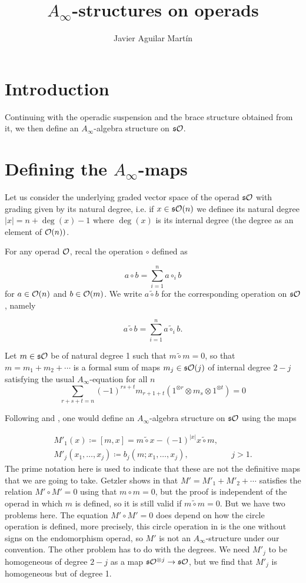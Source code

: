 \documentclass[twoside]{article}
\begin{document}
\title{$A_\infty$-structures on operads}
\author{Javier Aguilar Martín}
\maketitle

\section{Introduction}
Continuing with the operadic suspension and the brace structure obtained from it, we then define an $A_\infty$-algebra structure on $\mathfrak{s}{\mathcal O}$.


\section{Defining the $A_\infty$-maps}


Let us consider the underlying graded vector space of the operad $\mathfrak{s}{\mathcal O}$ with grading given by its natural degree, i.e. if $x\in \mathfrak{s}{\mathcal O}(n)$ we definee its natural degree $|x|=n+\deg(x)-1$ where $\deg(x)$ is its internal degree (the degree as an element of ${\mathcal O}(n))$. 

For any operad ${\mathcal O}$, recal the operation $\circ$ defined as

\[
a\circ b=\sum_{i=1}^n a\circ_i b
\]
for $a\in{\mathcal O}(n)$ and $b\in {\mathcal O}(m)$. We write $a\tilde{\circ}b$ for the corresponding operation on $\mathfrak{s}{\mathcal O}$, namely

\[
a\tilde{\circ} b=\sum_{i=1}^n a\tilde{\circ}_i b.
\]


Let $m\in\mathfrak{s}{\mathcal O}$ be of natural degree 1 such that $m\tilde{\circ}m=0$, so that $m=m_1+m_2+\cdots$ is a formal sum of maps $m_j\in\mathfrak{s}{\mathcal O}(j)$ of internal degree $2-j$ satisfying the usual $A_\infty$-equation for all $n$
\begin{equation}\label{Ainftyeq}
\sum_{r+s+t=n}(-1)^{rs+t}m_{r+1+t}(1^{\otimes r}\otimes m_s\otimes 1^{\otimes t})=0
\end{equation} 


Following \cite{GV} and \cite{getzler}, one would define an $A_\infty$-algebra structure on $\mathfrak{s}{\mathcal O}$ using the maps 

\begin{align*}
M'_1(x)\coloneqq [m,x]=m\tilde{\circ} x-(-1)^{|x|}x\tilde{\circ}m, & &  \\
M'_j(x_1,\dots, x_j)\coloneqq b_j(m;x_1,\dots, x_j),& &j>1.
\end{align*}
The prime notation here is used to indicate that these are not the definitive maps that we are going to take. Getzler shows in \cite{getzler} that $M'=M'_1+M'_2+\cdots$ satisfies the relation $M'\circ M'=0$ using that $m\circ m=0$, but the proof is independent of the operad in which $m$ is defined, so it is still valid if $m\tilde{\circ}m=0$. But we have two problems here. The equation $M'\circ M'=0$ does depend on how the circle operation is defined, more precisely, this circle operation in \cite{getzler} is the one without signs on the endomorphism operad, so $M'$ is not an $A_\infty$-structure under our convention. The other problem has to do with the degrees. We need $M'_j$ to be homogeneous of degree $2-j$ as a map $\mathfrak{s}{\mathcal O}^{\otimes j}\to \mathfrak{s}{\mathcal O}$, but we find that $M'_j$ is homogeneous but of degree 1. 
\end{document}

